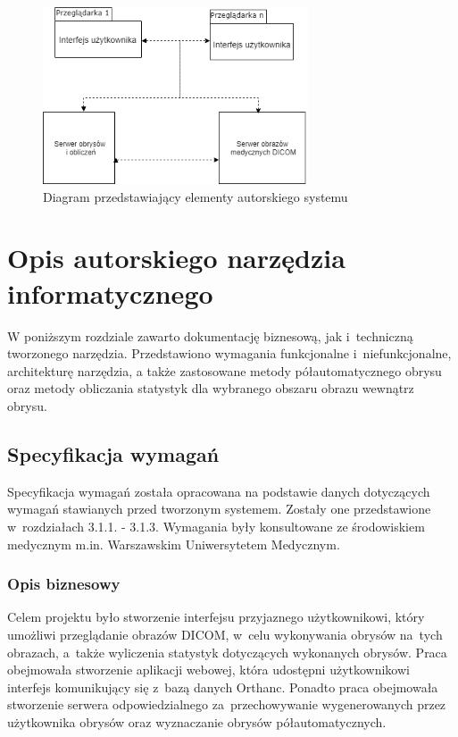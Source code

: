 \documentclass[a4paper,11pt,twoside,openright]{report}
\newcommand\blankpage{%
    \null
    \thispagestyle{empty}%
    \newpage}
\theoremstyle{definition}
\begin{document}
\begin{figure}[tb]
	\center
	\includegraphics[width=0.7\textwidth]{architektura2}
	\caption{Diagram przedstawiający elementy autorskiego systemu}
    	\label{fig:architektura2}
\end{figure}

\afterpage{\blankpage}

\chapter {Opis autorskiego narzędzia informatycznego}

W poniższym rozdziale zawarto dokumentację biznesową, jak i~techniczną tworzonego narzędzia.
Przedstawiono wymagania funkcjonalne i~niefunkcjonalne,
architekturę narzędzia, a także zastosowane metody półautomatycznego obrysu oraz metody obliczania
statystyk dla wybranego obszaru obrazu wewnątrz obrysu.

\section {Specyfikacja wymagań}

Specyfikacja wymagań została opracowana na podstawie danych dotyczących wymagań stawianych
przed tworzonym systemem. Zostały one przedstawione w~rozdziałach 3.1.1. - 3.1.3. Wymagania
były konsultowane ze
środowiskiem medycznym m.in. Warszawskim Uniwersytetem Medycznym.

\subsection {Opis biznesowy}

Celem projektu było stworzenie interfejsu przyjaznego użytkownikowi, który umożliwi
przeglądanie obrazów DICOM, w~celu wykonywania obrysów na~tych obrazach, a~także wyliczenia
statystyk dotyczących wykonanych obrysów. Praca
obejmowała stworzenie aplikacji webowej, która udostępni użytkownikowi interfejs
komunikujący się z~bazą danych Orthanc. Ponadto praca obejmowała stworzenie serwera
odpowiedzialnego za~przechowywanie wygenerowanych przez użytkownika obrysów oraz
wyznaczanie obrysów półautomatycznych.
\end{document}

